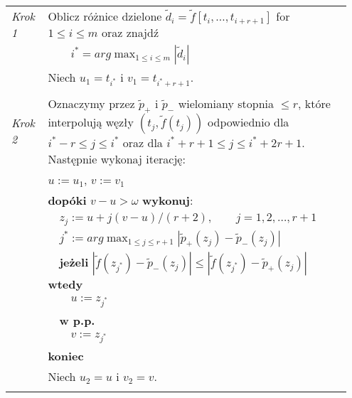 \documentclass[oik, pdftex, robocza, man]{mgrwms}
\begin{document}
    \vspace{10pt}
    \noindent
    \begin{tabular}{p{0.10\linewidth} p{0.85\linewidth}}
        
        \textit{Krok 1} & Oblicz różnice dzielone $\tilde{d}_i = \tilde{f}[t_i, \ldots, t_{i+r+1}]$ for $1 \leq i \leq m $ oraz znajdź \\
                        & \(\displaystyle \qquad i^* = arg \max_{1 \leq i \leq m }|\tilde{d}_i| \)  \\
                        & Niech $u_1 = t_{i^*}$ i $v_1 = t_{i^* + r + 1}$. \\
                        & \\

        \textit{Krok 2} & Oznaczymy przez $\tilde{p}_+$ i $\tilde{p}_-$ wielomiany stopnia $ \leq r$, które interpolują węzły $(t_j, \tilde{f}(t_j))$ odpowiednio dla $i^* - r \leq j \leq i^*$ oraz dla $i^* + r + 1 \leq j \leq i^* + 2r + 1$. Następnie wykonaj iterację: \\
                        & $u := u_1$, $v := v_1$ \\
                        & \textbf{dopóki} $v-u > \omega$ \textbf{wykonuj}: \\
                        & $\quad$$z_j := u + j(v-u) / (r+2), \qquad j = 1, 2, \ldots, r + 1$ \\
                        & $\quad$\(\displaystyle j^* := arg \max_{1 \leq j \leq r + 1}|\tilde{p}_{+}(z_j) - \tilde{p}_{-}(z_j)| \) \\
                        & $\quad$\textbf{jeżeli} $|\tilde{f}(z_{j^*}) - \tilde{p}_{-}(z_j)| \leq |\tilde{f}(z_{j^*}) - \tilde{p}_{+}(z_j)|$ \textbf{wtedy} \\
                        & $\quad\quad$$u:= z_{j^*}$ \\
                        & $\quad$\textbf{w p.p.} \\
                        & $\quad\quad$$v:= z_{j^*}$ \\
                        & \textbf{koniec} \\
                        & Niech $u_2 = u$ i $v_2 = v$. \\
                        & \\


\end{tabular}
\end{document}
